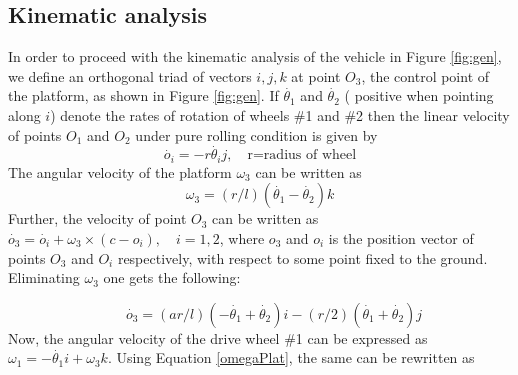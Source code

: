 \subsection{Kinematic analysis}
In order to proceed with the kinematic analysis of the vehicle in Figure \ref{fig:gen}, we define an orthogonal triad of vectors ${i,j,k}$ at point $O_3$, the control point of the platform, as shown in Figure \ref{fig:gen}. If $\dot{\theta_1}$ and $\dot{\theta_2}$ {( positive when pointing along $i$)} denote the rates of rotation of wheels \#1 and \#2 then the linear velocity of points $O_1$ and $O_2$ under pure rolling condition is given by 
\begin{equation}
\label{velO1}
{\dot{o_i}}=-r\dot{\theta_i}j, \quad \text{r=radius of wheel}
\end{equation}
The angular velocity of the platform $\omega_3$ can be written as 
\begin{equation}
\label{omegaPlat}
{\omega_3}=(r/l)(\dot{\theta_1}-\dot{\theta_2}){k}
\end{equation}
Further, the velocity of point $O_3$ can be written as
${\dot{o_3}=\dot{o_i}+\omega_3 \times (c-o_i)}, \quad i=1,2$, where $o_3 $ and $o_i$  is the position vector of points $O_3$ and $O_i$ respectively, with respect to some  point fixed to the ground. Eliminating $\omega_3$  one gets the following:

\begin{equation}
\label{velPlat}
 \quad \quad \dot{o_3}={(a r/l)(-\dot{\theta_1}+\dot{\theta_2})}i -(r/2)( \dot{\theta_1}+ \dot{\theta_2})j
\end{equation}
Now, the angular velocity of the drive wheel \#1 can be expressed as ${\omega_1}=-\dot{\theta_1}i+\omega_3k$. Using Equation \ref{omegaPlat}, the same can be rewritten as 

